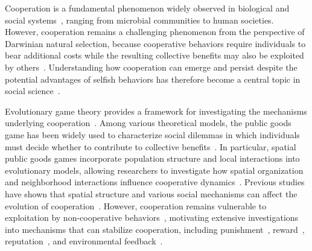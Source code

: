 \documentclass[%
  aip,
  amsmath,amssymb,
  reprint,
  showkeys,
]{revtex4-1}
\begin{document}
Cooperation is a fundamental phenomenon widely observed in biological and social systems~\cite{rand2013human,axelrod1981evolution}, ranging from microbial communities to human societies. 
However, cooperation remains a challenging phenomenon from the perspective of Darwinian natural selection, because cooperative behaviors require individuals to bear additional costs while the resulting collective benefits may also be exploited by others~\cite{sigmund2010calculus}. 
Understanding how cooperation can emerge and persist despite the potential advantages of selfish behaviors has therefore become a central topic in social science~\cite{pennisi2005did}.

Evolutionary game theory provides a framework for investigating the mechanisms underlying cooperation~\cite{smith1973logic,taylor1978evolutionary}. 
Among various theoretical models, the public goods game has been widely used to characterize social dilemmas in which individuals must decide whether to contribute to collective benefits~\cite{hauert2006evolutionary,kurokawa2009emergence,szolnoki2016competition}. 
In particular, spatial public goods games incorporate population structure and local interactions into evolutionary models, allowing researchers to investigate how spatial organization and neighborhood interactions influence cooperative dynamics~\cite{quan2018continuous,yang2018benefits,szolnoki2009impact,perc2013evolutionary}. 
Previous studies have shown that spatial structure and various social mechanisms can affect the evolution of cooperation~\cite{nowak1992evolutionary,ohtsuki2006simple,perc2010coevolutionary,perc2017statistical,nowak2006evolutionary}. 
However, cooperation remains vulnerable to exploitation by non-cooperative behaviors~\cite{olson1971logic}, motivating extensive investigations into mechanisms that can stabilize cooperation, including punishment~\cite{fehr2002altruistic,chen2014probabilistic,xie2024regulation,szolnoki2017antisocial,zhao2024emergence}, reward~\cite{david2009positive,wang2023synergistic}, reputation~\cite{milinski2002helps,santos2018social,ren2024interaction}, and environmental feedback~\cite{weitz2016oscillating,tilman2020evolutionary,wang2020eco}.
\end{document}
